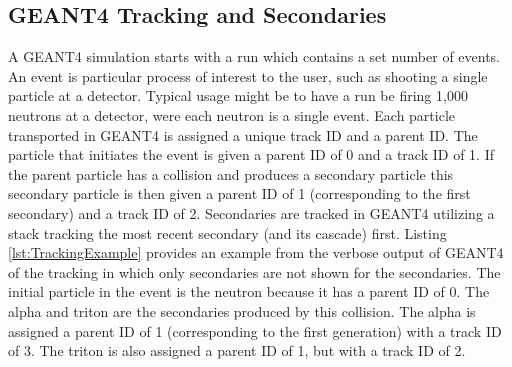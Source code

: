 \subsection{GEANT4 Tracking and Secondaries}
A GEANT4 simulation starts with a run which contains a set number of events.
An event is particular process of interest to the user, such as shooting a single particle at a detector. 
Typical usage might be to have a run be firing 1,000 neutrons at a detector, were each neutron is a single event.
Each particle transported in GEANT4 is assigned a unique track ID and a parent ID.
The particle that initiates the event is given a parent ID of 0 and a track ID of 1.
If the parent particle has a collision and produces a secondary particle this secondary particle is then given a parent ID of 1 (corresponding to the first secondary) and a track ID of 2.
Secondaries are tracked in GEANT4 utilizing a stack tracking the most recent secondary (and its cascade) first.
Listing \ref{lst:TrackingExample} provides an example from the verbose output of GEANT4 of the tracking in which only secondaries are not shown for the secondaries.
The initial particle in the event is the neutron because it has a parent ID of 0.
The alpha and triton are the secondaries produced by this collision. 
The alpha is assigned a parent ID of 1 (corresponding to the first generation) with a track ID of 3.
The triton is also assigned a parent ID of 1, but with a track ID of 2.
